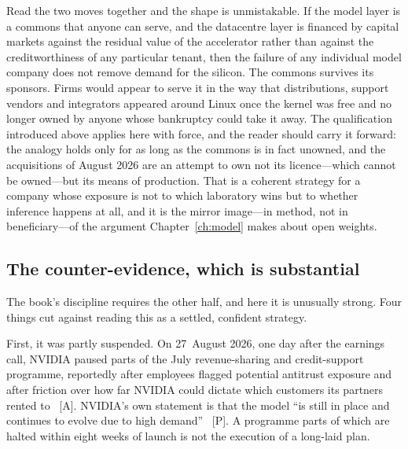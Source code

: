Read the two moves together and the shape is unmistakable. If the model layer is a commons that anyone can serve, and the datacentre layer is financed by capital markets against the residual value of the accelerator rather than against the creditworthiness of any particular tenant, then the failure of any individual model company does not remove demand for the silicon. The commons survives its sponsors. Firms would appear to serve it in the way that distributions, support vendors and integrators appeared around Linux once the kernel was free and no longer owned by anyone whose bankruptcy could take it away. The qualification introduced above applies here with force, and the reader should carry it forward: the analogy holds only for as long as the commons is in fact unowned, and the acquisitions of August 2026 are an attempt to own not its licence---which cannot be owned---but its means of production. That is a coherent strategy for a company whose exposure is not to which laboratory wins but to whether inference happens at all, and it is the mirror image---in method, not in beneficiary---of the argument Chapter~\ref{ch:model} makes about open weights.

\subsection{The counter-evidence, which is substantial}

The book's discipline requires the other half, and here it is unusually strong. Four things cut against reading this as a settled, confident strategy.

First, it was partly suspended. On 27~August 2026, one day after the earnings call, NVIDIA paused parts of the July revenue-sharing and credit-support programme, reportedly after employees flagged potential antitrust exposure and after friction over how far NVIDIA could dictate which customers its partners rented to~\cite{nvda-pause} [A]. NVIDIA's own statement is that the model ``is still in place and continues to evolve due to high demand''~\cite{nvda-pause} [P]. A programme parts of which are halted within eight weeks of launch is not the execution of a long-laid plan.

